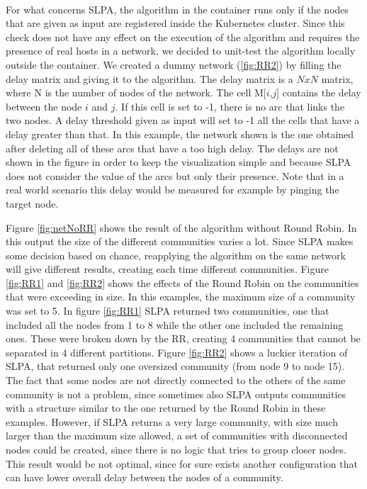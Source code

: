 \paragraph{}
For what concerns SLPA, the algorithm in the container runs only if the nodes that
are given as input are registered inside the Kubernetes cluster. Since this check does not have
any effect on the execution of the algorithm and requires the presence of real hosts in a network,
we decided to unit-test the algorithm locally outside the container.
We created a dummy network (\ref{fig:RR2}) by filling the delay matrix and giving it to the algorithm.
The delay matrix is a  $NxN$ matrix, where N is the number of nodes of the network.
The cell M[$i$,$j$] contains the delay between the node $i$ and $j$. If this
cell is set to -1, there is no arc that links the two nodes. A delay threshold given as input will set to -1
all the cells that have a delay greater than that. In this example, the network shown is the one obtained after 
deleting all of these arcs that have a too high delay. The delays are not shown in the figure in order
to keep the visualization simple and because SLPA does not consider the value of the arcs but only their presence.
Note that in a real world scenario this delay would be measured for example by pinging the target node.
\par
Figure \ref{fig:netNoRR} shows the result of the algorithm without Round Robin. In this output the size of the 
different communities varies a lot. Since SLPA makes some decision based on chance, reapplying the
algorithm on the same network will give different results, creating each time different communities.
Figure \ref{fig:RR1} and \ref{fig:RR2} shows the effects of the Round Robin on the communities that were exceeding 
in size. In this examples, the maximum size of a community was set to 5. In figure \ref{fig:RR1} SLPA returned
two communities, one that included all the nodes from 1 to 8 while the other one included the remaining ones.
These were broken down  by the RR, creating 4 communities that cannot be separated in 4 different partitions.
Figure \ref{fig:RR2} shows a luckier iteration of SLPA, that returned only one oversized community (from node 9
to node 15). 
\\
The fact that some nodes are not directly connected to the others of the same community is not a problem,
since sometimes also SLPA outputs communities with a structure similar to the one returned by the Round Robin in these examples.
However, if SLPA returns a very large community, with size much larger than the maximum size allowed, a set of communities
with disconnected nodes could be created, since there is no logic that tries to group closer nodes.
This result would be not optimal, since for sure exists another configuration that can have lower
overall delay between the nodes of a community.


